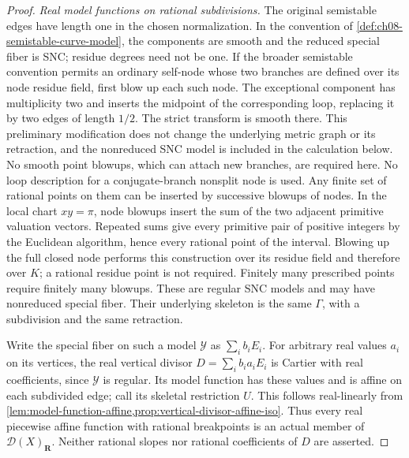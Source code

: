 \begin{proof}
\emph{Real model functions on rational subdivisions.}
The original semistable edges have length one in the chosen normalization.
In the convention of \cref{def:ch08-semistable-curve-model}, the components
are smooth and the reduced special fiber is SNC; residue degrees need not
be one.  If the broader semistable convention permits an ordinary
self-node whose two branches are defined over its node residue field,
first blow up each such node.  The exceptional
component has multiplicity two and inserts the midpoint of the
corresponding loop, replacing it by two edges of length \(1/2\).
The strict transform is smooth there.  This preliminary modification
does not change the underlying metric graph or its retraction, and the
nonreduced SNC model is included in the calculation below.  No smooth
point blowups, which can attach new branches, are required here.
No loop description for a conjugate-branch nonsplit node is used.
Any finite set of rational points on them can be inserted by successive
blowups of nodes.  In the local chart \(xy=\pi\), node blowups insert
the sum of the two adjacent primitive valuation vectors.  Repeated sums
give every primitive pair of positive integers by the Euclidean algorithm,
hence every rational point of the interval.  Blowing up the full closed
node performs this construction over its residue field and therefore over
\(K\); a rational residue point is not required.  Finitely many prescribed
points require finitely many blowups.  These are regular SNC models and
may have nonreduced special fiber.  Their underlying skeleton is the same
\(\Gamma\), with a subdivision and the same retraction.

Write the special fiber on such a model \(\mathcal Y\) as
\(\sum_i b_iE_i\).  For arbitrary real values \(a_i\) on its vertices,
the real vertical divisor \(D=\sum_i b_i a_i E_i\) is Cartier with real
coefficients, since \(\mathcal Y\) is regular.  Its model function has
these values and is affine on each subdivided edge; call its skeletal
restriction \(U\).  This follows real-linearly from
\cref{lem:model-function-affine,prop:vertical-divisor-affine-iso}.
Thus every real piecewise affine function with rational breakpoints is an
actual member of \(\mathcal D(X)_{\mathbf R}\).  Neither rational slopes
nor rational coefficients of \(D\) are asserted.


\end{proof}
